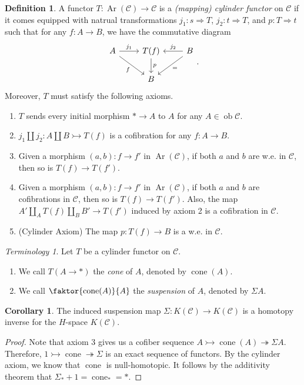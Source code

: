 \documentclass[10pt,letterpaper,cm]{nupset}
\theoremstyle{definition}
\newtheorem{definition}{Definition}
\theoremstyle{theorem}
\newtheorem{corollary}[theorem]{Corollary}
\theoremstyle{remark}
\newtheorem*{term}{Terminology}
\newcommand{\1}{\mathbf{1}}
\renewcommand{\c}{\mathscr{C}}
\newcommand{\0}{\vec 0}
\DeclareMathOperator{\ob}{ob}
\DeclareMathOperator{\Ar}{Ar}
\DeclareMathOperator{\cone}{cone}
\begin{document}
\begin{definition}
A functor $T: \Ar(\c) \to \c$ is a \textit{(mapping) cylinder functor} on $\c$ if it comes equipped with natrual transformations $j_1 :  s \Rightarrow T$, $j_2 : t \Rightarrow T$, and $p: T \Rightarrow t$ such that for any $f: A \to B$, we have the commutative diagram
\[
\begin{tikzcd}
A \arrow[r, "j_1"] \arrow[rd, "f"'] & T(f) \arrow[d, "p"] & B \arrow[l, "j_2"'] \arrow[ld, "="] \\
 & B & 
\end{tikzcd}
. \]
Moreover, $T$ must satisfy the following axioms.
\begin{enumerate}
\item $T$ sends every initial morphism $\ast \to A$ to $A$ for any $A \in \ob \c$.
\item $j_1 \coprod j_2 : A \coprod B \rightarrowtail T(f)$ is a cofibration for any $f: A \to B$.
\item Given a morphism $(a,b) : f \to f'$ in $\Ar(\c)$, if both $a$ and $b$ are w.e. in $\c$, then so is $T(f) \to T(f').$
\item Given a morphism $(a,b) : f \to f'$ in $\Ar(\c)$, if both $a$ and $b$ are cofibrations in $\c$, then so is $T(f) \to T(f')$. Also, the map $A' \coprod_A T(f) \coprod_B B' \to T(f')$ induced by axiom 2 is a cofibration in $\c$.
\item {(Cylinder Axiom)} The map $p: T(f) \to B$ is a w.e. in $\c$.
\end{enumerate}

\begin{term} Let $T$ be a cylinder functor on $\c$.
\begin{enumerate}
\item We call $T(A \to \ast)$ the \textit{cone} of $A$, denoted by $\cone(A)$.
\item We call $\faktor{\cone(A)}{A}$ the \textit{suspension} of $A$, denoted by $\Sigma A$. 
\end{enumerate}
\end{term}

\begin{corollary}
The induced suspension map $\Sigma : K(\c) \to K(\c)$ is a homotopy inverse for the $H$-space $K(\c)$.
\end{corollary}
\begin{proof}
Note that axiom 3 gives us a cofiber sequence $A \rightarrowtail \cone(A) \twoheadrightarrow \Sigma A$. Therefore, $1 \rightarrowtail \cone \twoheadrightarrow \Sigma$ is an exact sequence of functors. By the cylinder axiom, we know that $\cone$ is null-homotopic. It follows by the additivity theorem that $\Sigma_{\ast} + 1 =  \cone_{\ast} = \ast$.
\end{proof}
\end{definition}
\end{document}
